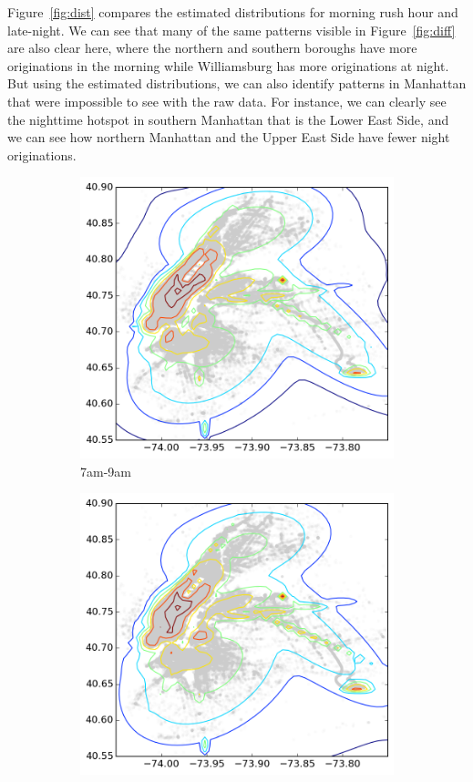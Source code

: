 \documentclass[12pt]{article}
\theoremstyle{definition}
\theoremstyle{algodesc}
\begin{document}
Figure~\ref{fig:dist} compares the estimated distributions for morning rush hour and late-night. We can see that many of the same patterns visible in Figure~\ref{fig:diff} are also clear here, where the northern and southern boroughs have more originations in the morning while Williamsburg has more originations at night. But using the estimated distributions, we can also identify patterns in Manhattan that were impossible to see with the raw data. For instance, we can clearly see the nighttime hotspot in southern Manhattan that is the Lower East Side, and we can see how northern Manhattan and the Upper East Side have fewer night originations.

\begin{figure}[htbp] \centering
  \begin{subfigure}[t]{.49\linewidth}
    \includegraphics[width=\linewidth]{./include/gmm_cat_morn.png}
    \caption{7am-9am} \label{fig:dist:morning}
  \end{subfigure}
  \begin{subfigure}[t]{.49\linewidth}
    \includegraphics[width=\linewidth]{./include/gmm_cat_night.png}

\end{subfigure}
\end{figure}
\end{document}
